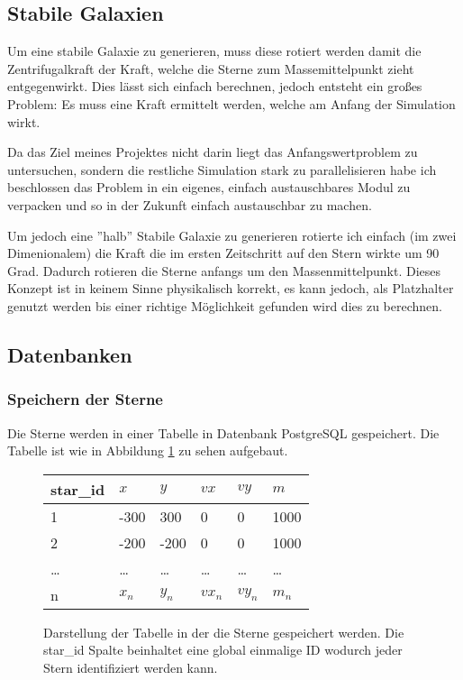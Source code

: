 \subsection{Stabile Galaxien}
Um eine stabile Galaxie zu generieren, muss diese rotiert werden damit die
Zentrifugalkraft der Kraft, welche die Sterne zum Massemittelpunkt zieht
entgegenwirkt. Dies lässt sich einfach berechnen, jedoch entsteht ein großes
Problem: Es muss eine Kraft ermittelt werden, welche am Anfang der Simulation wirkt.

\par Da das Ziel meines Projektes nicht darin liegt das Anfangswertproblem zu
untersuchen, sondern die restliche Simulation stark zu parallelisieren habe ich
beschlossen das Problem in ein eigenes, einfach austauschbares Modul zu
verpacken und so in der Zukunft einfach austauschbar zu machen.

\par Um jedoch eine ''halb'' Stabile Galaxie zu generieren rotierte ich einfach
(im zwei Dimenionalem) die Kraft die im ersten Zeitschritt auf den Stern wirkte
um 90 Grad. Dadurch rotieren die Sterne anfangs um den Massenmittelpunkt.
Dieses Konzept ist in keinem Sinne physikalisch korrekt, es kann jedoch, als
Platzhalter genutzt werden bis einer richtige Möglichkeit gefunden wird dies zu
berechnen.

\subsection{Datenbanken}

\subsubsection{Speichern der Sterne}
Die Sterne werden in einer Tabelle in Datenbank \mbox{PostgreSQL} gespeichert.
Die Tabelle ist wie in Abbildung \ref{fig:stars_table} zu sehen aufgebaut.

\begin{figure}[h!]
\centering
\begin{tabular} {l | l | l | l | l | l}
star\_id & \(x\) & \(y\) & \(vx\) & \(vy\) & \(m\) \\ \hline\hline
1 & -300 & 300 & 0 & 0 & 1000 \\ \hline
2 & -200 & -200 & 0 & 0 & 1000 \\ \hline
\dots & \dots & \dots & \dots & \dots & \dots \\ \hline
n & \(x_n\) & \(y_n\) & \(vx_n\)& \(vy_n\) & \(m_n\) \\ \hline
\end{tabular}
\caption{Darstellung der Tabelle in der die Sterne gespeichert werden. Die
star\_id Spalte beinhaltet eine global einmalige ID wodurch jeder Stern
identifiziert werden kann.}
\label{fig:stars_table}
\end{figure}


